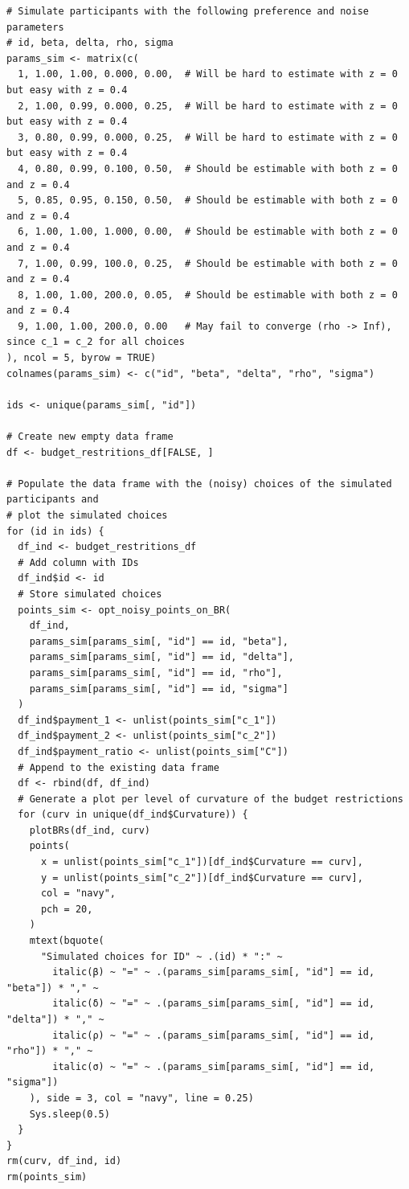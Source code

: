 \begin{lstlisting}
# Simulate participants with the following preference and noise parameters
# id, beta, delta, rho, sigma
params_sim <- matrix(c(
  1, 1.00, 1.00, 0.000, 0.00,  # Will be hard to estimate with z = 0 but easy with z = 0.4
  2, 1.00, 0.99, 0.000, 0.25,  # Will be hard to estimate with z = 0 but easy with z = 0.4
  3, 0.80, 0.99, 0.000, 0.25,  # Will be hard to estimate with z = 0 but easy with z = 0.4
  4, 0.80, 0.99, 0.100, 0.50,  # Should be estimable with both z = 0 and z = 0.4
  5, 0.85, 0.95, 0.150, 0.50,  # Should be estimable with both z = 0 and z = 0.4
  6, 1.00, 1.00, 1.000, 0.00,  # Should be estimable with both z = 0 and z = 0.4
  7, 1.00, 0.99, 100.0, 0.25,  # Should be estimable with both z = 0 and z = 0.4
  8, 1.00, 1.00, 200.0, 0.05,  # Should be estimable with both z = 0 and z = 0.4
  9, 1.00, 1.00, 200.0, 0.00   # May fail to converge (rho -> Inf), since c_1 = c_2 for all choices
), ncol = 5, byrow = TRUE)
colnames(params_sim) <- c("id", "beta", "delta", "rho", "sigma")

ids <- unique(params_sim[, "id"])

# Create new empty data frame
df <- budget_restritions_df[FALSE, ]

# Populate the data frame with the (noisy) choices of the simulated participants and
# plot the simulated choices
for (id in ids) {
  df_ind <- budget_restritions_df
  # Add column with IDs
  df_ind$id <- id
  # Store simulated choices
  points_sim <- opt_noisy_points_on_BR(
    df_ind,
    params_sim[params_sim[, "id"] == id, "beta"],
    params_sim[params_sim[, "id"] == id, "delta"],
    params_sim[params_sim[, "id"] == id, "rho"],
    params_sim[params_sim[, "id"] == id, "sigma"]
  )
  df_ind$payment_1 <- unlist(points_sim["c_1"])
  df_ind$payment_2 <- unlist(points_sim["c_2"])
  df_ind$payment_ratio <- unlist(points_sim["C"])
  # Append to the existing data frame
  df <- rbind(df, df_ind)
  # Generate a plot per level of curvature of the budget restrictions
  for (curv in unique(df_ind$Curvature)) {
    plotBRs(df_ind, curv)
    points(
      x = unlist(points_sim["c_1"])[df_ind$Curvature == curv],
      y = unlist(points_sim["c_2"])[df_ind$Curvature == curv],
      col = "navy",
      pch = 20,
    )
    mtext(bquote(
      "Simulated choices for ID" ~ .(id) * ":" ~
        italic(β) ~ "=" ~ .(params_sim[params_sim[, "id"] == id, "beta"]) * "," ~
        italic(δ) ~ "=" ~ .(params_sim[params_sim[, "id"] == id, "delta"]) * "," ~
        italic(ρ) ~ "=" ~ .(params_sim[params_sim[, "id"] == id, "rho"]) * "," ~
        italic(σ) ~ "=" ~ .(params_sim[params_sim[, "id"] == id, "sigma"])
    ), side = 3, col = "navy", line = 0.25)
    Sys.sleep(0.5)
  }
}
rm(curv, df_ind, id)
rm(points_sim)





\end{lstlisting}

